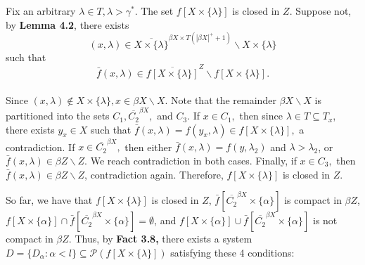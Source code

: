 \documentclass{article}
\begin{document}
																																				  \vskip 15pt
																																				  Fix an arbitrary $\lambda \in T, \lambda >\gamma^*.$
																																				  \vskip 10pt
																																				  The set $f\left[X\times \{\lambda\}\right]$ is closed in $Z$. Suppose not, by \textbf{Lemma 4.2}, there exists 
																																				  $$(x,\lambda)\in \overline{X\times \{\lambda\}}^{\beta X\times T(|\beta X|^+ +1)} \backslash X\times \{\lambda\}$$ such that $$\bar{f}(x,\lambda) \in \overline{f\left[X\times\{\lambda\}\right]}^Z \backslash f\left[X\times \{\lambda\}\right].$$ 
																																				  \\
																																				      Since $(x,\lambda)\notin X\times \{\lambda\}, x\in \beta X\backslash X.$ Note that the remainder $\beta X\backslash X$ is partitioned into the sets $C_1, \overline{C_2}^{\beta X},$ and $C_3$. If $x\in C_1,$ then since $\lambda \in T\subseteq T_x$, there exists $y_x\in X$ such that $\bar{f}(x,\lambda)= f(y_x,\lambda) \in f\left[X\times\{\lambda\}\right],$ a contradiction. If $x\in \overline{C_2}^{\beta X},$ then either $\bar{f}(x,\lambda)=f(y,\lambda_2)$ and $\lambda>\lambda_2$, or $\bar{f}(x,\lambda)\in \beta Z\backslash Z$. We reach contradiction in both cases. Finally, if $x\in C_3,$ then $\bar{f}(x,\lambda)\in \beta Z\backslash Z$, contradiction again. Therefore, $f\left[X\times\{\lambda\}\right]$ is closed in $Z$.


																																				      \vskip 20pt

																																				      So far, we have that $f\left[X\times\{\lambda\}\right]$ is closed in $Z$, $\bar{f}\left[\overline{C_2}^{\beta X} \times \{\alpha\}\right]$ is compact in $\beta Z$, $f\left[X\times \{\alpha\}\right]\cap \bar{f}\left[\overline{C_2}^{\beta X} \times \{\alpha\}\right] = \emptyset$, and $f\left[X\times \{\alpha\}\right]\cup \bar{f}\left[\overline{C_2}^{\beta X} \times \{\alpha\}\right]$ is not compact in $\beta Z$. Thus, by \textbf{Fact 3.8,} there exists a system $D=\{D_\alpha:\alpha<l\}\subseteq \mathcal{P}\left(f\left[X\times\{\lambda\}\right]\right)$ satisfying these 4 conditions:
\end{document}
